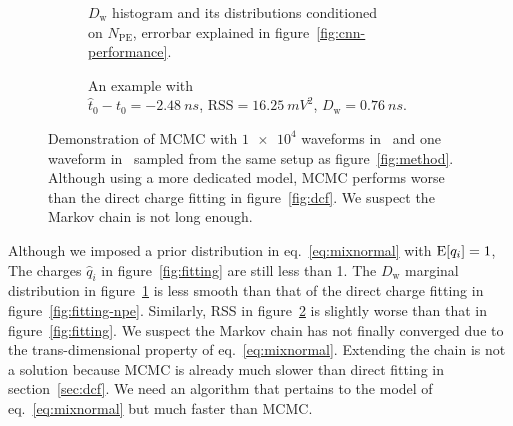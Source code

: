 \begin{figure}[H]
  \begin{subfigure}{.5\textwidth}
    \centering
    \resizebox{\textwidth}{!}{}
    \caption{\label{fig:mcmc-npe} $D_\mathrm{w}$ histogram and its distributions conditioned \\ on $N_{\mathrm{PE}}$, errorbar explained in figure~\ref{fig:cnn-performance}.}
  \end{subfigure}
  \begin{subfigure}{.5\textwidth}
    \centering
    \resizebox{\textwidth}{!}{}
    \caption{\label{fig:mcmc}An example with \\ $\hat{t}_0 - t_0=\SI{-2.48}{ns}$, $\mathrm{RSS}=\SI{16.25}{mV^2}$, $D_\mathrm{w}=\SI{0.76}{ns}$.}
  \end{subfigure}
  \caption{\label{fig:mcmc-performance}Demonstration of MCMC with $\num[retain-unity-mantissa=false]{1e4}$ waveforms in~ and one waveform in~ sampled from the same setup as figure~\ref{fig:method}.  Although using a more dedicated model, MCMC performs worse than the direct charge fitting in figure~\ref{fig:dcf}. We suspect the Markov chain is not long enough.}
\end{figure}
Although we imposed a prior distribution in eq.~\eqref{eq:mixnormal} with $\operatorname{E}[q_i]=1$, The charges $\hat{q}_i$ in figure~\ref{fig:fitting} are still less than 1.  The $D_\mathrm{w}$ marginal distribution in figure~\ref{fig:mcmc-npe} is less smooth than that of the direct charge fitting in figure~\ref{fig:fitting-npe}.  Similarly, RSS in figure~\ref{fig:mcmc} is slightly worse than that in figure~\ref{fig:fitting}.  We suspect the Markov chain has not finally converged due to the trans-dimensional property of eq.~\eqref{eq:mixnormal}.  Extending the chain is not a solution because MCMC is already much slower than direct fitting in section~\ref{sec:dcf}.  We need an algorithm that pertains to the model of eq.~\eqref{eq:mixnormal} but much faster than MCMC.

